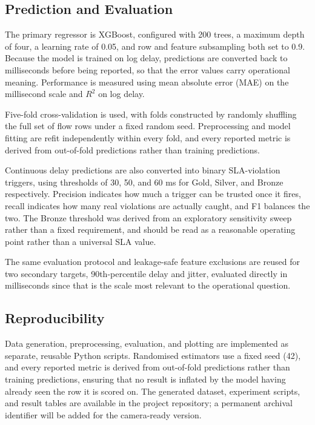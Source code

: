 \documentclass[12pt,onecolumn]{IEEEtran}
\begin{document}
\subsection{Prediction and Evaluation}

The primary regressor is XGBoost, configured with 200 trees, a maximum depth of four, a learning rate of 0.05, and row and feature subsampling both set to 0.9. Because the model is trained on log delay, predictions are converted back to milliseconds before being reported, so that the error values carry operational meaning. Performance is measured using mean absolute error (MAE) on the millisecond scale and $R^2$ on log delay.

Five-fold cross-validation is used, with folds constructed by randomly shuffling the full set of flow rows under a fixed random seed. Preprocessing and model fitting are refit independently within every fold, and every reported metric is derived from out-of-fold predictions rather than training predictions.

Continuous delay predictions are also converted into binary SLA-violation triggers, using thresholds of 30, 50, and 60 ms for Gold, Silver, and Bronze respectively. Precision indicates how much a trigger can be trusted once it fires, recall indicates how many real violations are actually caught, and F1 balances the two. The Bronze threshold was derived from an exploratory sensitivity sweep rather than a fixed requirement, and should be read as a reasonable operating point rather than a universal SLA value.

The same evaluation protocol and leakage-safe feature exclusions are reused for two secondary targets, 90th-percentile delay and jitter, evaluated directly in milliseconds since that is the scale most relevant to the operational question.

\subsection{Reproducibility}

Data generation, preprocessing, evaluation, and plotting are implemented as separate, reusable Python scripts. Randomised estimators use a fixed seed (42), and every reported metric is derived from out-of-fold predictions rather than training predictions, ensuring that no result is inflated by the model having already seen the row it is scored on. The generated dataset, experiment scripts, and result tables are available in the project repository; a permanent archival identifier will be added for the camera-ready version.
\end{document}

